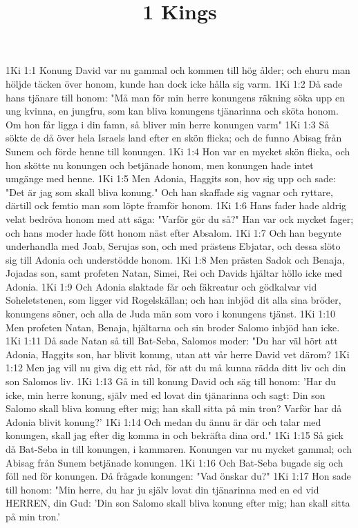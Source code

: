 

\title{1 Kings}

1Ki 1:1  Konung David var nu gammal och kommen till hög ålder; och ehuru man höljde täcken över honom, kunde han dock icke hålla sig varm.
1Ki 1:2  Då sade hans tjänare till honom: "Må man för min herre konungens räkning söka upp en ung kvinna, en jungfru, som kan bliva konungens tjänarinna och sköta honom. Om hon får ligga i din famn, så bliver min herre konungen varm"
1Ki 1:3  Så sökte de då över hela Israels land efter en skön flicka; och de funno Abisag från Sunem och förde henne till konungen.
1Ki 1:4  Hon var en mycket skön flicka, och hon skötte nu konungen och betjänade honom, men konungen hade intet umgänge med henne.
1Ki 1:5  Men Adonia, Haggits son, hov sig upp och sade: "Det är jag som skall bliva konung." Och han skaffade sig vagnar och ryttare, därtill ock femtio man som löpte framför honom.
1Ki 1:6  Hans fader hade aldrig velat bedröva honom med att säga: "Varför gör du så?" Han var ock mycket fager; och hans moder hade fött honom näst efter Absalom.
1Ki 1:7  Och han begynte underhandla med Joab, Serujas son, och med prästens Ebjatar, och dessa slöto sig till Adonia och understödde honom.
1Ki 1:8  Men prästen Sadok och Benaja, Jojadas son, samt profeten Natan, Simei, Rei och Davids hjältar höllo icke med Adonia.
1Ki 1:9  Och Adonia slaktade får och fäkreatur och gödkalvar vid Soheletstenen, som ligger vid Rogelskällan; och han inbjöd dit alla sina bröder, konungens söner, och alla de Juda män som voro i konungens tjänst.
1Ki 1:10  Men profeten Natan, Benaja, hjältarna och sin broder Salomo inbjöd han icke.
1Ki 1:11  Då sade Natan så till Bat-Seba, Salomos moder: "Du har väl hört att Adonia, Haggits son, har blivit konung, utan att vår herre David vet därom?
1Ki 1:12  Men jag vill nu giva dig ett råd, för att du må kunna rädda ditt liv och din son Salomos liv.
1Ki 1:13  Gå in till konung David och säg till honom: 'Har du icke, min herre konung, själv med ed lovat din tjänarinna och sagt: Din son Salomo skall bliva konung efter mig; han skall sitta på min tron? Varför har då Adonia blivit konung?'
1Ki 1:14  Och medan du ännu är där och talar med konungen, skall jag efter dig komma in och bekräfta dina ord."
1Ki 1:15  Så gick då Bat-Seba in till konungen, i kammaren. Konungen var nu mycket gammal; och Abisag från Sunem betjänade konungen.
1Ki 1:16  Och Bat-Seba bugade sig och föll ned för konungen. Då frågade konungen: "Vad önskar du?"
1Ki 1:17  Hon sade till honom: "Min herre, du har ju själv lovat din tjänarinna med en ed vid HERREN, din Gud: 'Din son Salomo skall bliva konung efter mig; han skall sitta på min tron.'
